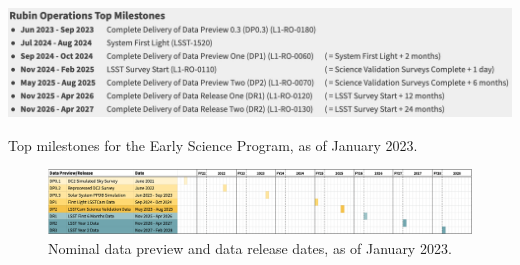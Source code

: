 \begin{table}
\label{tab:milestones}
\includegraphics[width=\linewidth]{figures/DPR-milestones}
\caption{Top milestones for the Early Science Program, as of January 2023.}
\end{table}

\begin{figure}
\includegraphics[width=\linewidth]{figures/DPR-timeline}
\caption{Nominal data preview and data release dates, as of January 2023.}
\label{fig:timeline}
\end{figure}
